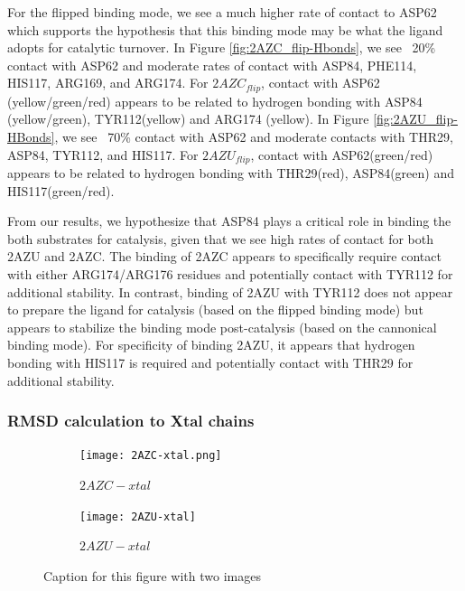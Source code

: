\documentclass[fleqn,10pt]{wlscirep}
\begin{document}
For the flipped binding mode, we see a much higher rate of contact to ASP62 which supports the hypothesis that this binding mode may be what the ligand adopts for catalytic turnover.
In Figure \ref{fig:2AZC_flip-Hbonds}, we see ~20\% contact with ASP62 and moderate rates of contact with ASP84, PHE114, HIS117, ARG169, and ARG174.
For $2AZC_{flip}$, contact with ASP62 (yellow/green/red) appears to be related to hydrogen bonding with ASP84 (yellow/green), TYR112(yellow) and ARG174 (yellow).
In Figure \ref{fig:2AZU_flip-HBonds}, we see ~70\% contact with ASP62 and moderate contacts with THR29, ASP84, TYR112, and HIS117.
For $2AZU_{flip}$, contact with ASP62(green/red) appears to be related to hydrogen bonding with THR29(red), ASP84(green) and HIS117(green/red).

From our results, we hypothesize that ASP84 plays a critical role in binding the both substrates for catalysis, given that we see high rates of contact for both 2AZU and 2AZC.
The binding of 2AZC appears to specifically require contact with either ARG174/ARG176 residues and potentially contact with TYR112 for additional stability.
In contrast, binding of 2AZU with TYR112 does not appear to prepare the ligand for catalysis (based on the flipped binding mode) but appears to stabilize the binding mode post-catalysis (based on the cannonical binding mode).
For specificity of binding 2AZU, it appears that hydrogen bonding with HIS117 is required and potentially contact with THR29 for additional stability.

\subsubsection{RMSD calculation to Xtal chains}
\begin{figure}[!ht]

\centering
\begin{subfigure}{.5\textwidth}
  \centering
  \texttt{[image: 2AZC-xtal.png]}
  \caption{$2AZC-xtal$}
  \label{fig:2AZC-xtal}
\end{subfigure}%
\begin{subfigure}{.5\textwidth}
  \centering
  \texttt{[image: 2AZU-xtal]}
  \caption{$2AZU-xtal$}
  \label{fig:2AZU-xtal}
\end{subfigure}
\caption{Caption for this figure with two images}
\label{fig:xtal}
\end{figure}
\end{document}
